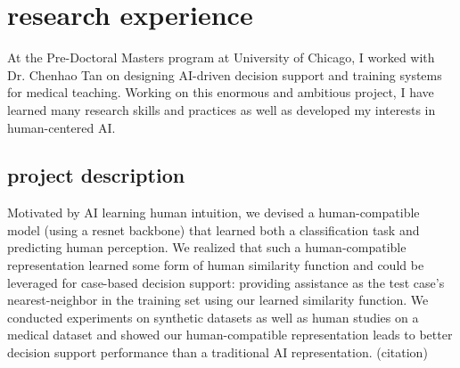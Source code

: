 
\section{research experience}

At the Pre-Doctoral Masters program at University of Chicago, I worked with Dr. Chenhao Tan on designing AI-driven decision support and training systems for medical teaching. Working on this enormous and ambitious project, I have learned many research skills and practices as well as developed my interests in human-centered AI.

\subsection{project description}
Motivated by AI learning human intuition, we devised a human-compatible model (using a resnet backbone) that learned both a classification task and predicting human perception. We realized that such a human-compatible representation learned some form of human similarity function and could be leveraged for case-based decision support: providing assistance as the test case's nearest-neighbor in the training set using our learned similarity function.
We conducted experiments on synthetic datasets as well as human studies on a medical dataset and showed our human-compatible representation leads to better decision support performance than a traditional AI representation. (citation)


